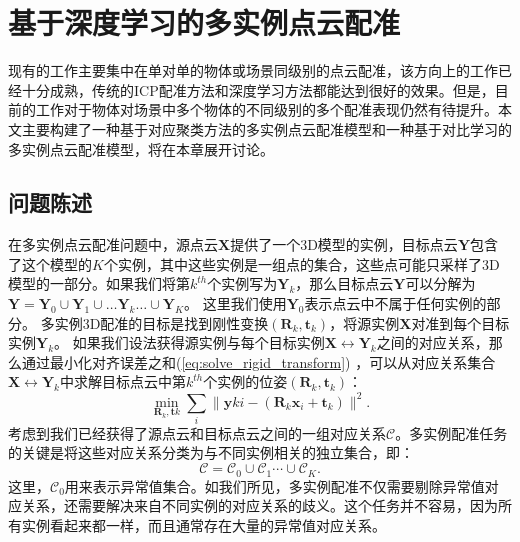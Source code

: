 \chapter{基于深度学习的多实例点云配准}
现有的工作主要集中在单对单的物体或场景同级别的点云配准，该方向上的工作已经十分成熟，传统的ICP配准方法\cite{barath2021progressive, li2020evaluation, shi2020improved}和深度学习方法\cite{qin2022geometric,barath2019progressive,barath2021progressive}都能达到很好的效果。但是，目前的工作对于物体对场景中多个物体的不同级别的多个配准表现仍然有待提升。本文主要构建了一种基于对应聚类方法的多实例点云配准模型和一种基于对比学习的多实例点云配准模型，将在本章展开讨论。
\section{问题陈述}

在多实例点云配准问题中，源点云$\mathbf{X}$提供了一个3D模型的实例，目标点云$\mathbf{Y}$包含了这个模型的$K$个实例，其中这些实例是一组点的集合，这些点可能只采样了3D模型的一部分。如果我们将第$k^{th}$个实例写为$\mathbf{Y}_k$，那么目标点云$\mathbf{Y}$可以分解为$
\mathbf{Y} = \mathbf{Y}_0 \cup \mathbf{Y}_1 \cup \ldots \mathbf{Y}_k \ldots \cup \mathbf{Y}_K$。
这里我们使用$\mathbf{Y}_0$表示点云中不属于任何实例的部分。
多实例3D配准的目标是找到刚性变换$(\mathbf{R}_k, \mathbf{t}_k)$，将源实例$\mathbf{X}$对准到每个目标实例$\mathbf{Y}_k$。
如果我们设法获得源实例与每个目标实例$\mathbf{X} \leftrightarrow \mathbf{Y}_k$之间的对应关系，那么通过最小化对齐误差之和(\ref{eq:solve_rigid_transform}) \cite{SVD}，可以从对应关系集合$\mathbf{X}\leftrightarrow \mathbf{Y}_k$中求解目标点云中第$k^{th}$个实例的位姿$(\mathbf{R}_k, \mathbf{t}_k)$：
\begin{equation}
\underset{\mathbf{R}_k,\mathbf{t}k}{\min}\sum_i{\parallel}\mathbf{y}{ki}-(\mathbf{R}_k\mathbf{x}_i+\mathbf{t}_k)\parallel ^2.
\label{eq:solve_rigid_transform}
\end{equation}
考虑到我们已经获得了源点云和目标点云之间的一组对应关系$\mathcal{C}$。多实例配准任务的关键是将这些对应关系分类为与不同实例相关的独立集合，即：
\begin{equation}
\mathcal{C} = \mathcal{C}_0 \cup \mathcal{C}_1\cdots \cup \mathcal{C}_K.
\end{equation}
这里，$\mathcal{C}_0$用来表示异常值集合。如我们所见，多实例配准不仅需要剔除异常值对应关系，还需要解决来自不同实例的对应关系的歧义。这个任务并不容易，因为所有实例看起来都一样，而且通常存在大量的异常值对应关系。

